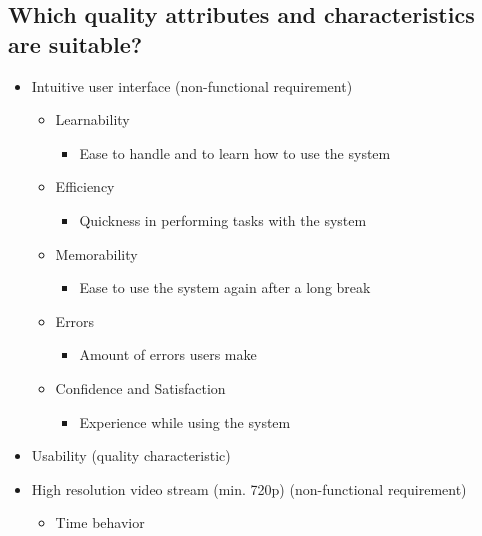 \documentclass{article}
\begin{document}
\subsection{Which quality attributes and characteristics are suitable?}
\begin{itemize}
    \item Intuitive user interface (non-functional requirement)
          \begin{itemize}
              \item Learnability
                    \begin{itemize}
                        \item Ease to handle and to learn how to use the system
                    \end{itemize}
              \item Efficiency
                    \begin{itemize}
                        \item Quickness in performing tasks with the system
                    \end{itemize}
              \item Memorability
                    \begin{itemize}
                        \item Ease to use the system again after a long break
                    \end{itemize}
              \item Errors
                    \begin{itemize}
                        \item Amount of errors users make
                    \end{itemize}
              \item Confidence and Satisfaction
                    \begin{itemize}
                        \item Experience while using the system
                    \end{itemize}
          \end{itemize}
    \item Usability (quality characteristic)
    \item High resolution video stream (min. 720p) (non-functional requirement)
          \begin{itemize}
              \item Time behavior
                    \begin{itemize}

\end{itemize}
\end{itemize}
\end{itemize}
\end{document}
